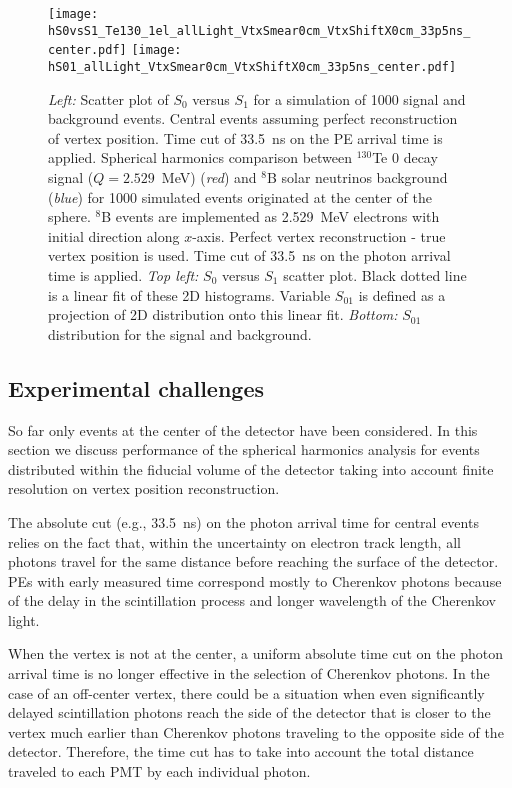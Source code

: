 \begin{figure*}[h]
  \centering
  \texttt{[image: hS0vsS1\_Te130\_1el\_allLight\_VtxSmear0cm\_VtxShiftX0cm\_33p5ns\_center.pdf]}
  \texttt{[image: hS01\_allLight\_VtxSmear0cm\_VtxShiftX0cm\_33p5ns\_center.pdf]}
  \caption{\emph{Left:} Scatter plot of $S_0$ versus $S_1$ for a simulation of 1000 signal and background events.
    Central events assuming perfect reconstruction of vertex position. Time cut of 33.5~ns on the PE arrival time is
    applied.
Spherical harmonics comparison between $^{130}$Te 0{\nbb}
    decay signal ($Q=2.529$~MeV) (\emph{red}) and $^{8}$B solar
    neutrinos background (\emph{blue}) for 1000 simulated events
    originated at the center of the sphere. $^{8}$B events are
    implemented as 2.529~MeV electrons with initial direction along
    $x$-axis. Perfect vertex reconstruction - true vertex position is
    used. Time cut of 33.5~ns on the photon arrival time is
    applied. \emph{Top left:} $S_0$ versus $S_1$ scatter plot. Black
    dotted line is a linear fit of these 2D histograms. Variable
    $S_{01}$ is defined as a projection of 2D distribution onto this
    linear fit. 
    \emph{Bottom:} $S_{01}$ distribution for the signal and
    background.}
\label{fig:SL_Te_33p5ns_center}
\end{figure*}


\subsection{Experimental challenges}

So far only events at the center of the detector have been
considered. In this section we discuss performance of the spherical
harmonics analysis for events distributed within the fiducial volume
of the detector taking into account finite resolution on vertex
position reconstruction.

The absolute cut (e.g., 33.5~ns) on the photon arrival time for central events relies on the fact that, within the uncertainty on electron track length, all photons travel for the same distance before  reaching the surface of the detector. 
PEs with early measured time correspond mostly to Cherenkov photons because of the delay in the scintillation process and longer wavelength of the Cherenkov light. 

When the vertex is not at the center, a uniform absolute time cut on the photon
arrival time is no longer effective in the selection of Cherenkov
photons. In the case of an off-center vertex, there could be a situation when even significantly delayed scintillation photons reach the side of the detector that is
closer to the vertex much earlier than Cherenkov photons traveling to
the opposite side of the detector. Therefore, the time cut has to take into account the total distance traveled to each PMT by each individual photon.


